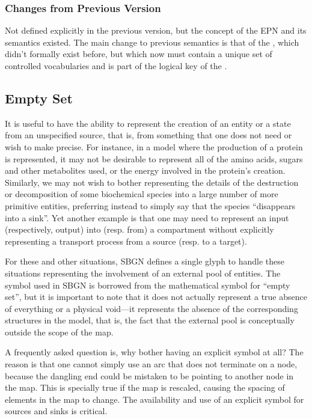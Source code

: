 \subsubsection{Changes from Previous Version}

Not defined explicitly in the previous version, but the concept of the
EPN and its semantics existed. The main change to previous semantics
is that of the , which didn't formally exist before,
but which now must contain a unique set of controlled vocabularies and
is part of the logical key of the .

\subsection{Empty Set}
\label{sec:sourceSink}

It is useful to have the ability to represent the creation of an entity or
a state from an unspecified source, that is, from something that one does
not need or wish to make precise.  For instance, in a model where the
production of a protein is represented, it may not be desirable to
represent all of the amino acids, sugars and other metabolites used, or the
energy involved in the protein's creation.  Similarly, we may not wish to
bother representing the details of the destruction or decomposition of some
biochemical species into a large number of more primitive entities,
preferring instead to simply say that the species ``disappears into a
sink''.  Yet another example is that one may need to represent an input
(respectively, output) into (resp. from) a compartment without explicitly
representing a transport process from a source (resp. to a target).

For these and other situations, SBGN defines a single glyph to handle
these situations representing the involvement of an external pool of
entities.  The symbol used in SBGN is borrowed from the mathematical
symbol for ``empty set'', but it is important to note that it does not
actually represent a true absence of everything or a physical
void---it represents the absence of the corresponding structures in
the model, that is, the fact that the external pool is conceptually
outside the scope of the map.

A frequently asked question is, why bother having an explicit symbol at
all?  The reason is that one cannot simply use an arc that does not
terminate on a node, because the dangling end could be mistaken to be
pointing to another node in the map.  This is specially true if the
map is rescaled, causing the spacing of elements in the map to
change.  The availability and use of an explicit symbol for sources and
sinks is critical.

